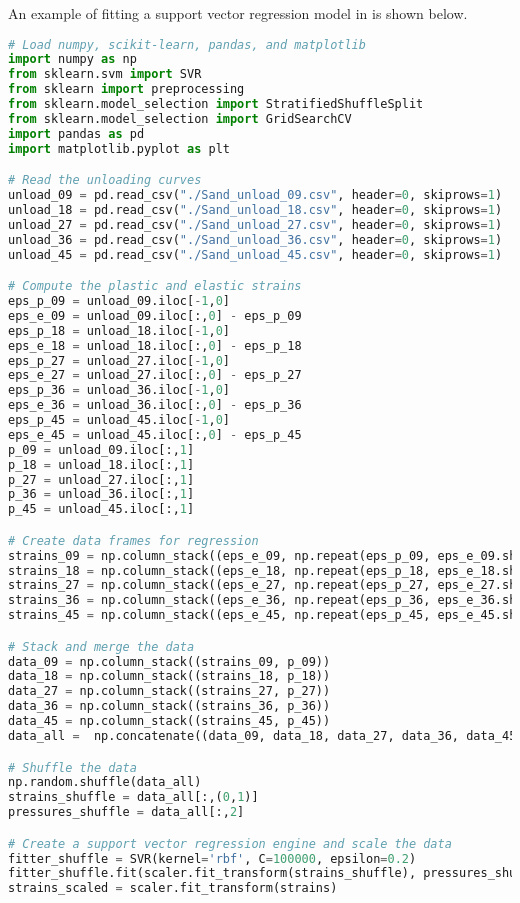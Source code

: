 An example of fitting a support vector regression model in  is shown below.
\begin{lstlisting}[language=Python]
# Load numpy, scikit-learn, pandas, and matplotlib
import numpy as np
from sklearn.svm import SVR
from sklearn import preprocessing
from sklearn.model_selection import StratifiedShuffleSplit
from sklearn.model_selection import GridSearchCV
import pandas as pd
import matplotlib.pyplot as plt

# Read the unloading curves
unload_09 = pd.read_csv("./Sand_unload_09.csv", header=0, skiprows=1)
unload_18 = pd.read_csv("./Sand_unload_18.csv", header=0, skiprows=1)
unload_27 = pd.read_csv("./Sand_unload_27.csv", header=0, skiprows=1)
unload_36 = pd.read_csv("./Sand_unload_36.csv", header=0, skiprows=1)
unload_45 = pd.read_csv("./Sand_unload_45.csv", header=0, skiprows=1)

# Compute the plastic and elastic strains
eps_p_09 = unload_09.iloc[-1,0]
eps_e_09 = unload_09.iloc[:,0] - eps_p_09
eps_p_18 = unload_18.iloc[-1,0]
eps_e_18 = unload_18.iloc[:,0] - eps_p_18
eps_p_27 = unload_27.iloc[-1,0]
eps_e_27 = unload_27.iloc[:,0] - eps_p_27
eps_p_36 = unload_36.iloc[-1,0]
eps_e_36 = unload_36.iloc[:,0] - eps_p_36
eps_p_45 = unload_45.iloc[-1,0]
eps_e_45 = unload_45.iloc[:,0] - eps_p_45
p_09 = unload_09.iloc[:,1]
p_18 = unload_18.iloc[:,1]
p_27 = unload_27.iloc[:,1]
p_36 = unload_36.iloc[:,1]
p_45 = unload_45.iloc[:,1]

# Create data frames for regression
strains_09 = np.column_stack((eps_e_09, np.repeat(eps_p_09, eps_e_09.shape[0])))
strains_18 = np.column_stack((eps_e_18, np.repeat(eps_p_18, eps_e_18.shape[0])))
strains_27 = np.column_stack((eps_e_27, np.repeat(eps_p_27, eps_e_27.shape[0])))
strains_36 = np.column_stack((eps_e_36, np.repeat(eps_p_36, eps_e_36.shape[0])))
strains_45 = np.column_stack((eps_e_45, np.repeat(eps_p_45, eps_e_45.shape[0])))

# Stack and merge the data
data_09 = np.column_stack((strains_09, p_09))
data_18 = np.column_stack((strains_18, p_18))
data_27 = np.column_stack((strains_27, p_27))
data_36 = np.column_stack((strains_36, p_36))
data_45 = np.column_stack((strains_45, p_45))
data_all =  np.concatenate((data_09, data_18, data_27, data_36, data_45), axis=0)

# Shuffle the data
np.random.shuffle(data_all)
strains_shuffle = data_all[:,(0,1)]
pressures_shuffle = data_all[:,2]

# Create a support vector regression engine and scale the data
fitter_shuffle = SVR(kernel='rbf', C=100000, epsilon=0.2)
fitter_shuffle.fit(scaler.fit_transform(strains_shuffle), pressures_shuffle)
strains_scaled = scaler.fit_transform(strains)


\end{lstlisting}

